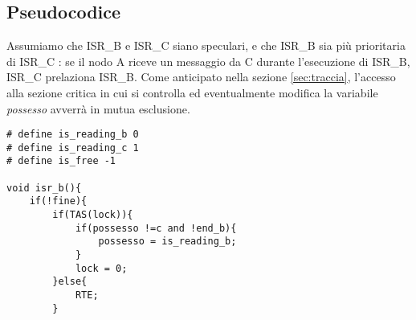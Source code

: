 \documentclass{article}
\begin{document}
\subsection{Pseudocodice}
Assumiamo che ISR\_B e ISR\_C siano speculari, e che ISR\_B sia più prioritaria di ISR\_C : se il nodo A riceve un messaggio da C durante l'esecuzione di ISR\_B, ISR\_C prelaziona ISR\_B. Come anticipato nella sezione \ref{sec:traccia}, l'accesso alla sezione critica in cui si controlla ed eventualmente modifica la variabile \textit{possesso} avverrà in mutua esclusione.

\vspace{2\baselineskip}
\begin{lstlisting}
# define is_reading_b 0
# define is_reading_c 1
# define is_free -1 

void isr_b(){
    if(!fine){
        if(TAS(lock)){
            if(possesso !=c and !end_b){
                possesso = is_reading_b;
            }
            lock = 0;
        }else{
            RTE;
        }


\end{lstlisting}
\end{document}
